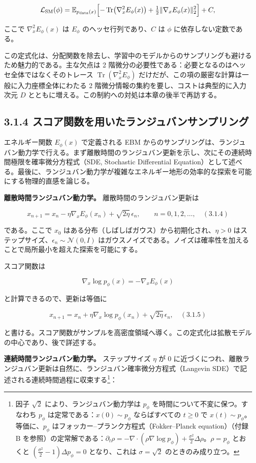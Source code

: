 \[
\mathcal{L}_{\mathrm{SM}}(\phi)
= \mathbb{E}_{p_{\mathrm{data}}(x)}\Bigl[-\operatorname{Tr}\bigl(\nabla_x^2 E_\phi(x)\bigr) + \tfrac{1}{2}\|\nabla_x E_\phi(x)\|_2^2\Bigr] + C,
\]


ここで $\nabla_x^2 E_\phi(x)$ は $E_\phi$ のヘッセ行列であり、$C$ は $\phi$ に依存しない定数である。

この定式化は、分配関数を除去し、学習中のモデルからのサンプリングも避けるため魅力的である。主な欠点は 2 階微分の必要性である：必要となるのはヘッセ全体ではなくそのトレース $\operatorname{Tr}(\nabla_x^2 E_\phi)$ だけだが、この項の厳密な計算は一般に入力座標全体にわたる 2 階微分情報の集約を要し、コストは典型的に入力次元 $D$ とともに増える。この制約への対処は本章の後半で再訪する。

\subsection*{3.1.4 スコア関数を用いたランジュバンサンプリング}


エネルギー関数 $E_\phi(x)$ で定義される EBM からのサンプリングは、ランジュバン動力学で行える。まず離散時間のランジュバン更新を示し、次にその連続時間極限を確率微分方程式（SDE, Stochastic Differential Equation）として述べる。最後に、ランジュバン動力学が複雑なエネルギー地形の効率的な探索を可能にする物理的直感を論じる。

\textbf{離散時間ランジュバン動力学。} 離散時間のランジュバン更新は

\[
x_{n+1} = x_n - \eta\nabla_x E_\phi(x_n) + \sqrt{2\eta}\,\epsilon_n, \qquad n = 0,1,2,\ldots,\quad (3.1.4)
\]


である。ここで $x_0$ はある分布（しばしばガウス）から初期化され、$\eta > 0$ はステップサイズ、$\epsilon_n \sim \mathcal{N}(0, I)$ はガウスノイズである。ノイズは確率性を加えることで局所最小を超えた探索を可能にする。

スコア関数は

\[
\nabla_x \log p_\phi(x) = -\nabla_x E_\phi(x)
\]


と計算できるので、更新は等価に

\[
x_{n+1} = x_n + \eta\nabla_x \log p_\phi(x_n) + \sqrt{2\eta}\,\epsilon_n,\quad (3.1.5)
\]


と書ける。スコア関数がサンプルを高密度領域へ導く。この定式化は拡散モデルの中心であり、後で詳述する。

\textbf{連続時間ランジュバン動力学。} ステップサイズ $\eta$ が 0 に近づくにつれ、離散ランジュバン更新は自然に、ランジュバン確率微分方程式（Langevin SDE）で記述される連続時間過程に収束する\footnote{因子 $\sqrt{2}$ により、ランジュバン動力学は $p_\phi$ を時間について不変に保つ。すなわち $p_\phi$ は定常である：$x(0) \sim p_\phi$ ならばすべての $t \ge 0$ で $x(t) \sim p_\phi$。等価に、$p_\phi$ はフォッカー–プランク方程式（Fokker–Planck equation）（付録 B を参照）の定常解である：$\partial_t \rho = -\nabla\cdot(\rho\nabla\log p_\phi) + \frac{\sigma^2}{2}\Delta\rho$。$\rho = p_\phi$ とおくと $(\frac{\sigma^2}{2}-1)\Delta p_\phi = 0$ となり、これは $\sigma = \sqrt{2}$ のときのみ成り立つ。}：

